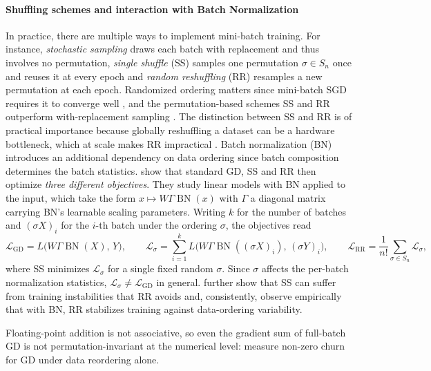 \documentclass[mathematics,review,submit,moreauthors]{Definitions/mdpi}
\begin{document}
\paragraph{Shuffling schemes and interaction with Batch Normalization}
In practice, there are multiple ways to implement mini-batch training.
For instance, \emph{stochastic sampling} draws each batch with replacement and thus involves no permutation, \emph{single shuffle} (SS) samples one permutation $\sigma\in S_n$ once and reuses it at every epoch and \emph{random reshuffling} (RR) resamples a new permutation at each epoch.
Randomized ordering matters since mini-batch SGD requires it to converge well \citep{xu2024vj}, and the permutation-based schemes SS and RR outperform with-replacement sampling \citep{koloskova2024p4icml}.
The distinction between SS and RR is of practical importance because globally reshuffling a dataset can be a hardware bottleneck, which at scale makes RR impractical \citep{nguyen20222iipdpsi,koloskova2024p4icml,xu2024vj}.
Batch normalization (BN) introduces an additional dependency on data ordering since batch composition determines the batch statistics.
\citet{wu2023p4icml} show that standard GD, SS and RR then optimize \emph{three different objectives}.
They study linear models with BN applied to the input, which take the form $x \mapsto W\Gamma\operatorname{BN}(x)$ with $\Gamma$ a diagonal matrix carrying BN's learnable scaling parameters.
Writing $k$ for the number of batches and $(\sigma X)_i$ for the $i$-th batch under the ordering $\sigma$, the objectives read
$$
\mathcal{L}_{\mathrm{GD}} = L\big(W\Gamma\operatorname{BN}(X),\, Y\big), \qquad
\mathcal{L}_{\sigma} = \sum_{i=1}^{k} L\big(W\Gamma\operatorname{BN}((\sigma X)_i),\, (\sigma Y)_i\big), \qquad
\mathcal{L}_{\mathrm{RR}} = \frac{1}{n!}\sum_{\sigma\in S_n} \mathcal{L}_{\sigma},
$$
where SS minimizes $\mathcal{L}_\sigma$ for a single fixed random $\sigma$.
Since $\sigma$ affects the per-batch normalization statistics, $\mathcal{L}_\sigma \neq \mathcal{L}_{\mathrm{GD}}$ in general.
\citet{wu2023p4icml} further show that SS can suffer from training instabilities that RR avoids and, consistently, \citet{zhuang2022pmls} observe empirically that with BN, RR stabilizes training against data-ordering variability.

\begin{Remark}
    Floating-point addition is not associative, so even the gradient sum of full-batch GD is not permutation-invariant at the numerical level: \citet{zhuang2022pmls} measure non-zero churn for GD under data reordering alone.
\end{Remark}
\end{document}
